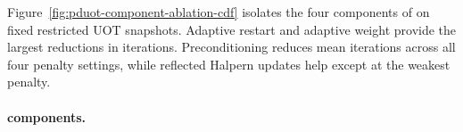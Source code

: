 Figure~\ref{fig:pduot-component-ablation-cdf} isolates the four components of \subsolver on fixed restricted UOT snapshots.
Adaptive restart and adaptive weight provide the largest reductions in iterations.
Preconditioning reduces mean iterations across all four penalty settings, while reflected Halpern updates help except at the weakest penalty.



\paragraph{\ours components.}

